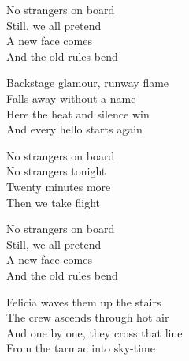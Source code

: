 \begin{lyrics}
No strangers on board\\
Still, we all pretend\\
A new face comes\\
And the old rules bend

Backstage glamour, runway flame\\
Falls away without a name\\
Here the heat and silence win\\
And every hello starts again

No strangers on board\\
No strangers tonight\\
Twenty minutes more\\
Then we take flight

No strangers on board\\
Still, we all pretend\\
A new face comes\\
And the old rules bend

Felicia waves them up the stairs\\
The crew ascends through hot air\\
And one by one, they cross that line\\
From the tarmac into sky-time
\end{lyrics}

